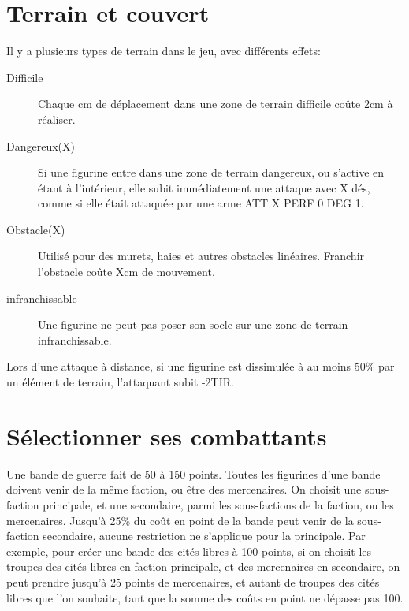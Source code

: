 \documentclass[10pt,a4paper]{article}
\begin{document}
\begin{multicols}{3}
\section*{Terrain et couvert}
Il y a plusieurs types de terrain dans le jeu, avec différents effets:
\begin{description}
\item[Difficile]Chaque cm de déplacement dans une zone de terrain difficile coûte 2cm à réaliser.
\item[Dangereux(X)]Si une figurine entre dans une zone de terrain dangereux, ou s'active en étant à l'intérieur, elle subit immédiatement une attaque avec X dés, comme si elle était attaquée par une arme ATT X PERF 0 DEG 1.
\item[Obstacle(X)]Utilisé pour des murets, haies et autres obstacles linéaires. Franchir l'obstacle coûte Xcm de mouvement.
\item[infranchissable]Une figurine ne peut pas poser son socle sur une zone de terrain infranchissable.
\end{description}
Lors d'une attaque à distance, si une figurine est dissimulée à au moins 50\% par un élément de terrain, l'attaquant subit -2TIR.
\section*{Sélectionner ses combattants}
Une bande de guerre fait de 50 à 150 points. Toutes les figurines d'une bande doivent venir de la même faction, ou être des mercenaires. On choisit une sous-faction principale, et une secondaire, parmi les sous-factions de la faction, ou les mercenaires. Jusqu'à 25\% du coût en point de la bande peut venir de la sous-faction secondaire, aucune restriction ne s'applique pour la principale. Par exemple, pour créer une bande des cités libres à 100 points, si on choisit les troupes des cités libres en faction principale, et des mercenaires en secondaire, on peut prendre jusqu'à 25 points de mercenaires, et autant de troupes des cités libres que l'on souhaite, tant que la somme des coûts en point ne dépasse pas 100.

\end{multicols}
\end{document}
